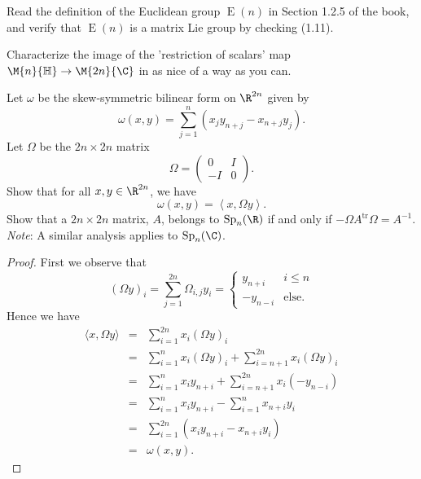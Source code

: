 \documentclass[10pt]{amsart}
\begin{document}
\begin{ex}
  Read the definition of the Euclidean group $\operatorname{E}(n)$ in Section 1.2.5 of the book, and verify that $\operatorname{E}(n)$ is a matrix Lie group by checking (1.11).
\end{ex}

\begin{ex}
  Characterize the image of the 'restriction of scalars' map $\M{n}{\mathbb{H}} \rightarrow \M{2n}{\C}$ in as nice of a way as you can.
\end{ex}

\begin{ex}
  Let $\omega$ be the skew-symmetric bilinear form on $\R^{2n}$ given by 
  $$\omega(x,y) = \sum_{j = 1}^n (x_jy_{n + j} - x_{n+j}y_j).$$
  Let $\Omega$ be the $2n \times 2n$ matrix
  $$\Omega = \left(\begin{matrix}
    0 & I\\
    -I & 0
    \end{matrix}\right).$$
  Show that for all $x,y \in \R^{2n}$, we have
  $$\omega(x,y) = \left<x, \Omega y\right>.$$
  Show that a $2n \times 2n$ matrix, $A$, belongs to $\operatorname{Sp}_n(\R)$ if and only if $-\Omega A^\text{tr} \Omega = A^{-1}$.\\
  {\it Note}: A similar analysis applies to $\operatorname{Sp}_n(\C)$.
  \begin{proof}
    First we observe that 
    $$\left(\Omega y\right)_{i} = \sum_{j = 1}^{2n} \Omega_{i,j}y_i 
    = \left\{
    \begin{array}{cc}
      y_{n + i} & i \leq n\\
      -y_{n - i} & \text{else}.
    \end{array}
    \right.$$
    Hence we have
    \begin{eqnarray*}
      \langle x, \Omega y \rangle &=& \sum_{i=1}^{2n} x_i(\Omega y)_i \\
      &=& \sum_{i=1}^{n} x_i(\Omega y)_i + \sum_{i=n+1}^{2n} x_i(\Omega y)_i \\
      &=& \sum_{i=1}^{n} x_iy_{n+i} + \sum_{i=n+1}^{2n} x_i(-y_{n -i})\\
      &=& \sum_{i=1}^{n} x_iy_{n+i} - \sum_{i=1}^{n} x_{n + i}y_{i}\\
      &=& \sum_{i=1}^{2n} \left(x_iy_{n+i} - x_{n + i} y_{i}\right)\\
      &=& \omega(x,y).
    \end{eqnarray*}


\end{proof}
\end{ex}
\end{document}
